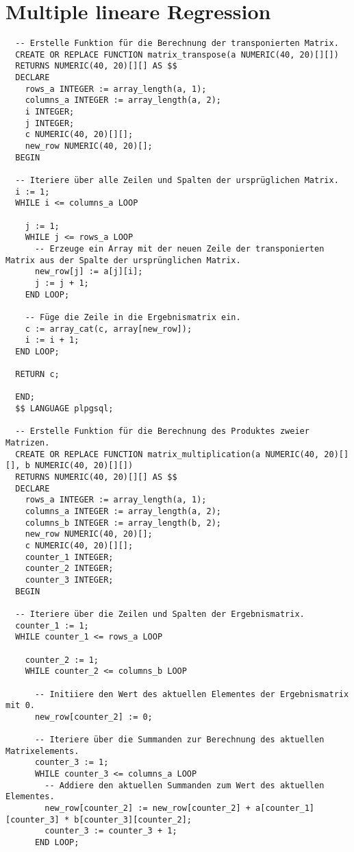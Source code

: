 \section{Multiple lineare Regression}
\label{appendix:E:2}

\begin{verbatim}
  -- Erstelle Funktion für die Berechnung der transponierten Matrix.
  CREATE OR REPLACE FUNCTION matrix_transpose(a NUMERIC(40, 20)[][])
  RETURNS NUMERIC(40, 20)[][] AS $$
  DECLARE
    rows_a INTEGER := array_length(a, 1);
    columns_a INTEGER := array_length(a, 2);
    i INTEGER;
    j INTEGER;
    c NUMERIC(40, 20)[][];
    new_row NUMERIC(40, 20)[];
  BEGIN

  -- Iteriere über alle Zeilen und Spalten der ursprüglichen Matrix.
  i := 1;
  WHILE i <= columns_a LOOP

    j := 1;
    WHILE j <= rows_a LOOP
      -- Erzeuge ein Array mit der neuen Zeile der transponierten Matrix aus der Spalte der ursprünglichen Matrix.
      new_row[j] := a[j][i];
      j := j + 1;
    END LOOP;

    -- Füge die Zeile in die Ergebnismatrix ein.
    c := array_cat(c, array[new_row]);
    i := i + 1;
  END LOOP;

  RETURN c;

  END;
  $$ LANGUAGE plpgsql;

  -- Erstelle Funktion für die Berechnung des Produktes zweier Matrizen.
  CREATE OR REPLACE FUNCTION matrix_multiplication(a NUMERIC(40, 20)[][], b NUMERIC(40, 20)[][])
  RETURNS NUMERIC(40, 20)[][] AS $$
  DECLARE
    rows_a INTEGER := array_length(a, 1);
    columns_a INTEGER := array_length(a, 2);
    columns_b INTEGER := array_length(b, 2);
    new_row NUMERIC(40, 20)[];
    c NUMERIC(40, 20)[][];
    counter_1 INTEGER;
    counter_2 INTEGER;
    counter_3 INTEGER;
  BEGIN

  -- Iteriere über die Zeilen und Spalten der Ergebnismatrix.
  counter_1 := 1;
  WHILE counter_1 <= rows_a LOOP

    counter_2 := 1;
    WHILE counter_2 <= columns_b LOOP

      -- Initiiere den Wert des aktuellen Elementes der Ergebnismatrix mit 0.
      new_row[counter_2] := 0;

      -- Iteriere über die Summanden zur Berechnung des aktuellen Matrixelements.
      counter_3 := 1;
      WHILE counter_3 <= columns_a LOOP
        -- Addiere den aktuellen Summanden zum Wert des aktuellen Elementes.
        new_row[counter_2] := new_row[counter_2] + a[counter_1][counter_3] * b[counter_3][counter_2];
        counter_3 := counter_3 + 1;
      END LOOP;


\end{verbatim}
